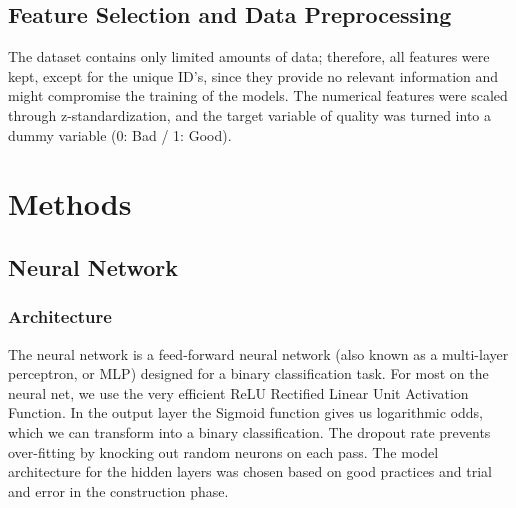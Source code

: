 \documentclass[
]{report}
\begin{document}
\subsection{Feature Selection and Data
Preprocessing}\label{feature-selection-and-data-preprocessing}

The dataset contains only limited amounts of data; therefore, all
features were kept, except for the unique ID's, since they provide no
relevant information and might compromise the training of the models.
The numerical features were scaled through z-standardization, and the
target variable of quality was turned into a dummy variable (0: Bad / 1:
Good).

\section{Methods}\label{methods}

\subsection{Neural Network}\label{neural-network}

\subsubsection{Architecture}\label{architecture}

The neural network is a feed-forward neural network (also known as a
multi-layer perceptron, or MLP) designed for a binary classification
task. For most on the neural net, we use the very efficient ReLU
Rectified Linear Unit Activation Function. In the output layer the
Sigmoid function gives us logarithmic odds, which we can transform into
a binary classification. The dropout rate prevents over-fitting by
knocking out random neurons on each pass. The model architecture for the
hidden layers was chosen based on good practices and trial and error in
the construction phase.
\end{document}
